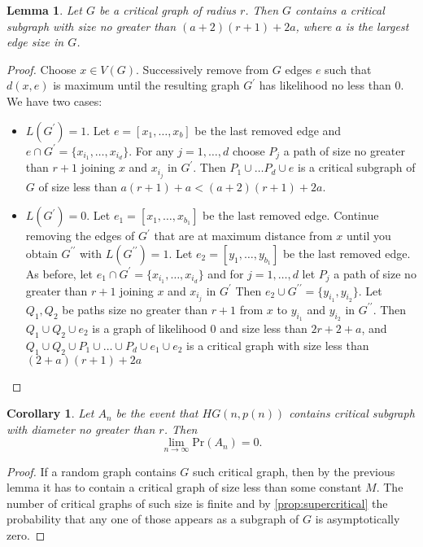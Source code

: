 \documentclass[11pt,notitlepage,a4paper]{article}
\newtheorem{lemma}{Lemma}[section]
\newtheorem{corollary}{Corollary}[section]
\theoremstyle{definition}
\newcommand{\Ln}{\lim\limits_{n\to \infty}}
\begin{document}
\begin{lemma}
	Let $G$ be a critical graph of radius $r$.
	Then $G$ contains a critical subgraph with size no greater than
	$(a+2)(r+1)+2a$, where $a$ is the largest edge size in $G$. 
\end{lemma}
\begin{proof}
	Choose $x\in V(G)$. Successively remove from $G$ edges $e$
	such that $d(x, e)$ is maximum until the resulting graph 
	$G^\prime$ has likelihood no less than $0$. We have two cases:
	\begin{itemize}[leftmargin=*]
		\item $L(G^\prime)=1$. Let $e=[x_1, \dots, x_b]$ be
		the last removed edge and
		$e\cap G^\prime=\{ x_{i_1}, \dots, x_{i_d}\}$.
		For any $j=1,\dots, d$ choose 
		$P_j$ a path of size no greater than $r+1$ joining
		$x$ and $x_{i_j}$ in $G^\prime$.   
		Then $P_1\cup \dots P_d \cup e$ is a critical subgraph of $G$
		of size less than $a(r+1) + a< (a+2)(r+1) + 2a$.
		\item $L(G^\prime)=0$. Let $e_1=[x_1, \dots, x_{b_1}]$ be the
		last removed edge. Continue removing the edges of $G^\prime$ 
		that are at maximum distance from $x$ until you obtain 
		$G^{\prime \prime}$ with $L(G^{\prime\prime})=1$. Let 
		$e_2=[y_1, \dots, y_{b_1}]$ be the last removed edge.
		As before, let $e_1\cap G^\prime=\{ x_{i_1}, \dots, x_{i_d}\}$
		and for $j=1,\dots, d$ let $P_j$ a path of size no greater than $r+1$ 
		joining	$x$ and $x_{i_j}$ in $G^\prime$
		Then $e_2 \cup G^{\prime \prime}=\{ y_{i_1}, y_{i_2}  \}$.
		Let $Q_1, Q_2$ be paths size no greater than $r+1$ from
		$x$ to $y_{i_1}$ and $y_{i_2}$ in $G^{\prime \prime}$.
		Then $Q_1 \cup Q_2 \cup e_2$ is a graph of likelihood $0$ 
		and size less than $2r+2 + a$,
		and $Q_1\cup Q_2\cup P_1 \cup \dots \cup P_d \cup e_1 \cup e_2$ 
		is a critical graph	with size less than $(2+a)(r+1) + 2a$	
	\end{itemize} 
\end{proof}


\begin{corollary}
	Let $A_n$ be the event that $HG(n,p(n))$ contains critical 
	subgraph with diameter no greater than $r$. Then
	\[ \Ln \mathrm{Pr}(A_n)=0. \]
\end{corollary}
\begin{proof}
	If a random graph contains $G$ such critical graph, then by the previous
	lemma it has to contain a critical graph of size less than some constant $M$.
	The number of critical graphs of such size is finite and by
	\cref{prop:supercritical} the probability 
	that any one of those appears as a subgraph of $G$ is asymptotically zero.	 
\end{proof}
\end{document}
